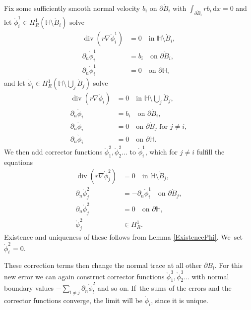 \documentclass[10pt]{amsart}
\let\backslash\setminus
\let\ts\textstyle
\theoremstyle{definition}
\renewcommand{\div}{\operatorname{div}}
\newcommand\eq{=}
\newcommand\dd{\,\mathrm{d}}
\newcommand\dx{\dd x}
\let\de\partial
\begin{document}
Fix some sufficiently smooth normal velocity $b_i$ on $\de \grave{B}_i$ with $\int_{\de \grave{B}_i} rb_i\dx=0$ and let $\grave{\phi}_i^1\in H_R^1(\mathbb{H}\backslash \grave{B}_i)$ solve
\begin{align*}
\div(r\nabla\grave{\phi}_i^1)&\eq 0\quad\text{in $\mathbb{H}\backslash \grave{B}_i$},\\
\de_n \grave{\phi}_i^1&\eq b_i\quad\text{on $\de \grave{B}_i$},\\
\de_n\grave{\phi}_i^1&\eq0 \quad\text{on $\de\mathbb{H}$},
\end{align*}
and let $\grave{\phi}_i\in H_R^1(\mathbb{H}\backslash\bigcup_j\grave{B}_j)$ solve
\begin{align*}
\div(r\nabla\grave{\phi}_i)&\eq 0\quad\text{in $\mathbb{H}\backslash \ts\bigcup_j \grave{B}_j$},\\
\de_n \grave{\phi}_i&\eq b_i\quad\text{on $\de \grave{B}_i$},\\
\de_n \grave{\phi}_i&\eq0 \quad\text{on $\de \grave{B}_j$ for $j\neq i$},\\
\de_n \grave{\phi}_i&\eq0 \quad\text{on $\de\mathbb{H}$}.
\end{align*}
We then add corrector functions $\grave{\phi}_{1}^2,\grave{\phi}_{2}^2\dots$ to $\grave{\phi}_i^1$, which for $j\neq i$ fulfill the equations
\begin{align*}
\div(r\nabla\grave{\phi}_{j}^2)&\eq0 \quad\text{in $\mathbb{H}\backslash \grave{B}_j$},\\
\de_n \grave{\phi}_{j}^2&\eq-\de_n \grave{\phi}_i^1 \quad\text{on $\de \grave{B}_j$},\\
\de_n\grave{\phi}_j^2&\eq0 \quad\text{on $\de\mathbb{H}$},\\
 \grave{\phi}_j^2&\in H_R^1.
\end{align*}
Existence and uniqueness of these follows from Lemma \ref{ExistencePhi}. We~set $\grave{\phi}_i^2=0$.

These correction terms then change the normal trace at all other $\de B_l$. For this new error we can again construct corrector functions $\grave{\phi}_{1}^3,\grave{\phi}_{2}^3\dots$ with normal boundary values $-\sum_{l\neq j} \de_n \grave{\phi}_l^2$ and so on. If~the sums of the errors and the corrector functions converge, the limit will be $\grave{\phi}_i$, since it is unique.
\end{document}
